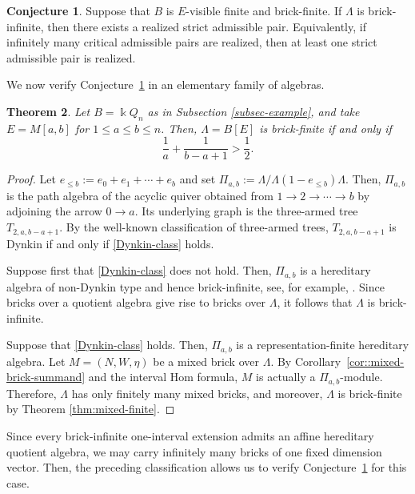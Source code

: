 \documentclass[a4,12pt]{amsart}
\numberwithin{equation}{section} %
\newtheorem{theorem}{Theorem}[section] %
\theoremstyle{definition} %
\newtheorem{conjecture}[theorem]{Conjecture} %
\begin{document}
\begin{conjecture}\label{conj:critical-to-strict}
Suppose that $B$ is $E$-visible finite and brick-finite. If $\Lambda$ is brick-infinite, then there exists a realized strict admissible pair. Equivalently, if infinitely many critical admissible pairs are realized, then at least one strict admissible pair is realized.
\end{conjecture}

We now verify Conjecture~\ref{conj:critical-to-strict} in an elementary family of algebras.

\begin{theorem}\label{thm:interval-classification}
Let $B=\Bbbk Q_n$ as in Subsection \ref{subsec-example}, and take $E=M[a,b]$ for $1\leq a\leq b\leq n$. Then, $\Lambda=B[E]$ is brick-finite if and only if
\begin{equation}\label{Dynkin-class}
\frac1a+\frac1{b-a+1}>\frac12.
\end{equation}
\end{theorem}
\begin{proof}
Let $e_{\leq b}:=e_0+e_1+\cdots+e_b$ and set $\Pi_{a,b}:=\Lambda/\Lambda(1-e_{\leq b})\Lambda$. Then, $\Pi_{a,b}$ is the path algebra of the acyclic quiver obtained from $1\to2\to\cdots\to b$ by adjoining the arrow $0\to a$. Its underlying graph is the three-armed tree $T_{2,a,b-a+1}$. By the well-known classification of three-armed trees, $T_{2,a,b-a+1}$ is Dynkin if and only if \eqref{Dynkin-class} holds. 

Suppose first that \eqref{Dynkin-class} does not hold. Then, $\Pi_{a,b}$ is a hereditary algebra of non-Dynkin type and hence brick-infinite, see, for example, \cite[Remark 2.9]{Mousavand-biserial}. Since bricks over a quotient algebra give rise to bricks over $\Lambda$, it follows that $\Lambda$ is brick-infinite.

Suppose that \eqref{Dynkin-class} holds. Then, $\Pi_{a,b}$ is a representation-finite hereditary algebra. Let $M=(N,W,\eta)$ be a mixed brick over $\Lambda$. By Corollary~\ref{cor::mixed-brick-summand} and  the interval Hom formula, $M$ is actually a $\Pi_{a,b}$-module. Therefore, $\Lambda$ has only finitely many mixed bricks, and moreover, $\Lambda$ is brick-finite by Theorem \ref{thm:mixed-finite}.
\end{proof}

Since every brick-infinite one-interval extension admits an affine hereditary quotient algebra, we may carry infinitely many bricks of one fixed dimension vector. Then, the preceding classification allows us to verify Conjecture~\ref{conj:critical-to-strict} for this case.
\end{document}
